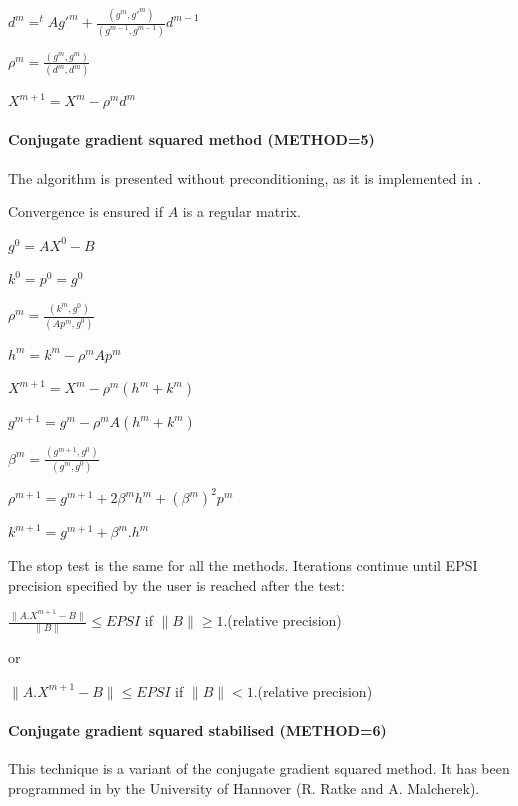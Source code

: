 $d^{m} =  ^{t}Ag'^{m}
        + \frac{(g^{m},g'^{m})}
               {(g^{m-1},g^{m-1})} d^{m-1}$

$\rho ^{m} = \frac{(g^{m},g^{m})}{(d^{m},d^{m})}$

$X^{m+1} =  X^{m}  -  \rho ^{m} d^{m}$

\paragraph{Conjugate gradient squared method (METHOD=5)}

The algorithm is presented without preconditioning, as it is implemented in
\bief.

Convergence is ensured if $A$ is a regular matrix.


$g^{0}  =  A X^{0} - B$

$k^{0}  =  p^{0}  =  g^{0}$


$\rho ^{m} = \frac{(k^{m},g^{0})}{(Ap^{m},g^{0})}$

$h^{m}  =  k^{m}  -  \rho ^{m} A p^{m}$

$X^{m+1} =  X^{m}  -  \rho ^{m} (h^{m}  +  k^{m})$

$g^{m+1} =  g^{m}  -  \rho ^{m} A (h^{m}  +  k^{m})$

$\beta ^{m} = \frac{(g^{m+1},g^{0})}{(g^{m},g^{0})}$

$\rho ^{m+1} = g^{m+1} + 2\beta^{m}h^{m}+ (\beta ^{m})^{2}p^{m}$

$k^{m+1}  =  g^{m+1}  +  \beta ^{m}.h^{m}$

The stop test is the same for all the methods. Iterations continue until EPSI
precision specified by the user is reached after the test:

$\frac{\lVert{A.X^{m+1}-B}\rVert}{\lVert{B}\rVert} \leq EPSI$
if $\lVert{B}\rVert \ge 1.$(relative precision)

or

$\lVert{A.X^{m+1}-B}\rVert \leq EPSI$ if $\lVert{B}\rVert < 1.$(relative precision)

\paragraph{Conjugate gradient squared stabilised (METHOD=6)}

This technique is a variant of the conjugate gradient squared
method. It has been programmed in \bief by the University of Hannover (R. Ratke
and A. Malcherek).

